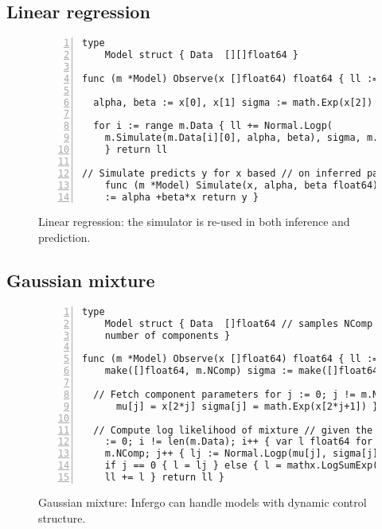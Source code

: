 \documentclass[sigplan,review,10pt,anonymous]{acmart}
\begin{document}
\begin{sloppypar}
\subsection{Linear regression}

\begin{figure}
	\begin{lstlisting}[framexleftmargin=10pt,numbers=left] type
	Model struct { Data  [][]float64 }

func (m *Model) Observe(x []float64) float64 { ll := 0.

  alpha, beta := x[0], x[1] sigma := math.Exp(x[2])

  for i := range m.Data { ll += Normal.Logp(
	m.Simulate(m.Data[i][0], alpha, beta), sigma, m.Data[i][1])
	} return ll

// Simulate predicts y for x based // on inferred parameters.
	func (m *Model) Simulate(x, alpha, beta float64) float64 { y
	:= alpha +beta*x return y } \end{lstlisting} \caption{Linear
	regression: the simulator is re-used in both inference and
prediction.} \label{fig:linear-regression} \end{figure}

\subsection{Gaussian mixture}

\begin{figure}
	\begin{lstlisting}[framexleftmargin=10pt,numbers=left] type
	Model struct { Data  []float64 // samples NComp int       //
	number of components }

func (m *Model) Observe(x []float64) float64 { ll := 0.0 mu :=
	make([]float64, m.NComp) sigma := make([]float64, m.NComp)

  // Fetch component parameters for j := 0; j != m.NComp; j++ {
	  mu[j] = x[2*j] sigma[j] = math.Exp(x[2*j+1]) }

  // Compute log likelihood of mixture // given the data for i
	:= 0; i != len(m.Data); i++ { var l float64 for j := 0; j !=
	m.NComp; j++ { lj := Normal.Logp(mu[j], sigma[j], m.Data[i])
	if j == 0 { l = lj } else { l = mathx.LogSumExp(l, lj) } }
	ll += l } return ll } \end{lstlisting} \caption{Gaussian
	mixture: Infergo can handle models with dynamic control
	structure.} \label{fig:gaussian-mixture} \end{figure}


\end{sloppypar}
\end{document}
